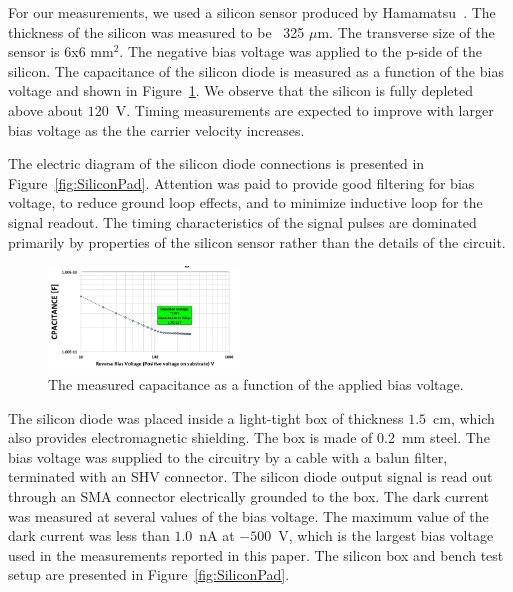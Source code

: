 \documentclass[12pt]{article}
\begin{document}
{For our measurements, we used a silicon sensor produced by
Hamamatsu~\cite{hamamatsu}. The thickness of the silicon was measured to be ~325
$\mu$m. The transverse size of the sensor is 6x6 mm$^2$. The negative bias
voltage was applied to the p-side of the silicon. The capacitance
of the silicon diode is measured as a function of the bias voltage
and shown in Figure~\ref{fig:SiliconDiode}. We observe that the silicon
is fully depleted above about $120$~V. Timing measurements are expected
to improve with larger bias voltage as the the carrier velocity increases.

The electric diagram of the silicon
diode connections is presented in Figure~\ref{fig:SiliconPad}. Attention was
paid to provide good filtering for bias voltage, to reduce ground loop effects, and
to minimize inductive loop for the signal readout. The timing characteristics
of the signal pulses are dominated primarily by properties of the
silicon sensor rather than the details of the circuit.

\begin{figure}[htbp] 
\centering
\includegraphics[width=0.45\textwidth]{plots/SiliconDiodeCV.png} 
\caption{The measured capacitance as a function of the applied bias voltage.} 
\label{fig:SiliconDiode} 
\end{figure} 

The silicon diode was placed inside a light-tight box of thickness $1.5$~cm,
which also provides electromagnetic shielding. The box is made of 0.2~mm steel.
The bias voltage was supplied to the circuitry by a cable with a balun filter,
terminated with an SHV connector. The silicon diode output signal is read out
through an SMA connector electrically grounded to the box. The dark current was
measured at several values of the bias voltage. The maximum value of the dark
current was less than $1.0$~nA at $-500$~V, which is the largest bias voltage
used in the measurements reported in this paper. The silicon box and bench test
setup are presented in Figure~\ref{fig:SiliconPad}. 

}
\end{document}
